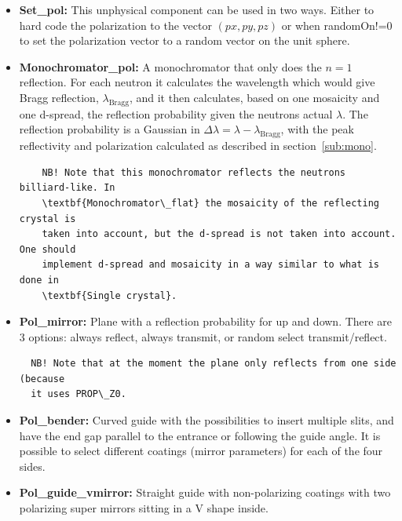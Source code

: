 \begin{itemize}
\item \textbf{Set\_pol:} This unphysical component can be used in two
ways. Either to hard code the polarization to the vector $(px, py, pz)$
or when randomOn!=0 to set the polarization vector to a random vector
on the unit sphere.\\

\item \textbf{Monochromator\_pol:} A monochromator that only does the $n=1$
  reflection. For each neutron it calculates the wavelength which would give
  Bragg reflection, $\lambda_\text{Bragg}$, and it then calculates, based on
  one mosaicity and one d-spread, the reflection probability given the neutrons
  actual $\lambda$.  The reflection probability is a Gaussian in $\Delta
  \lambda = \lambda - \lambda_\text{Bragg}$, with the peak reflectivity and
  polarization calculated as described in section~\ref{sub:mono}.

  \begin{lstlisting}
    NB! Note that this monochromator reflects the neutrons billiard-like. In
    \textbf{Monochromator\_flat} the mosaicity of the reflecting crystal is
    taken into account, but the d-spread is not taken into account. One should
    implement d-spread and mosaicity in a way similar to what is done in
    \textbf{Single crystal}.
  \end{lstlisting}

\item \textbf{Pol\_mirror:} Plane with a reflection probability for up
and down. There are 3 options: always reflect, always transmit, or
random select transmit/reflect.

\begin{lstlisting}
  NB! Note that at the moment the plane only reflects from one side (because
  it uses PROP\_Z0.
\end{lstlisting}

\item \textbf{Pol\_bender:} Curved guide with the possibilities to
  insert multiple slits, and have the end gap parallel to the entrance
  or following the guide angle. It is possible to select different
  coatings (mirror parameters) for each of the four sides.\\

\item \textbf{Pol\_guide\_vmirror:} Straight guide with non-polarizing
  coatings with two polarizing super mirrors sitting in a V shape
  inside. \\
\end{itemize}

